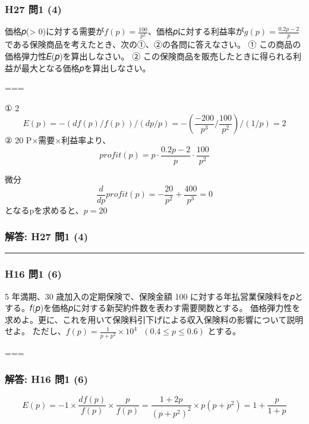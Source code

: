 \documentclass[]{article}
\begin{document}
\hypertarget{h27-ux554f1-4}{%
\subsubsection{H27 問1 (4)}\label{h27-ux554f1-4}}

価格𝑝(\textgreater{}
0)に対する需要が\(f(p)=\frac{100}{p^2}\)、価格𝑝に対する利益率が\(g(p)=\frac{0.2p-2}{p}\)である保険商品を考えたとき、次の①、②の各問に答えなさい。
① この商品の価格弾力性𝐸(𝑝)を算出しなさい。 ②
この保険商品を販売したときに得られる利益が最大となる価格𝑝を算出しなさい。

===

① 2
\[ E(p) = -(df(p)/f(p)) / (dp/p) = -(\frac{-200}{p^3}/\frac{100}{p^2})/(1/p) = 2\]
② 20 P×需要×利益率より、
\[profit(p)=p\cdot\frac{0.2p-2}{p}\cdot\frac{100}{p^2}\]

微分 \[\frac{d}{dp} profit(p) = -\frac{20}{p^2}+\frac{400}{p^3}=0\]
となるpを求めると、\(p=20\)

\hypertarget{ux89e3ux7b54-h27-ux554f1-4}{%
\subsubsection{解答: H27 問1 (4)}\label{ux89e3ux7b54-h27-ux554f1-4}}

\begin{center}\rule{0.5\linewidth}{0.5pt}\end{center}

\hypertarget{h16-ux554f1-6}{%
\subsubsection{H16 問1 (6)}\label{h16-ux554f1-6}}

5 年満期、30 歳加入の定期保険で、保険金額 100
に対する年払営業保険料を𝑝とする。𝑓(𝑝)を価格𝑝に対する新契約件数を表わす需要関数とする。
価格弾力性を求めよ。更に、これを用いて保険料引下げによる収入保険料の影響について説明せよ。
ただし、\(f(p)=\frac{1}{p+p^2}\times 10^4\ \ \  (0.4\leq p \leq 0.6)\)
とする。

===

\hypertarget{ux89e3ux7b54-h16-ux554f1-6}{%
\subsubsection{解答: H16 問1 (6)}\label{ux89e3ux7b54-h16-ux554f1-6}}

\[E(p)=-1\times\frac{df(p)}{f(p)}\times\frac{p}{f(p)}
=\frac{1+2p}{(p+p^2)^2}\times p(p+p^2)
= 1 + \frac{p}{1+p}\]
\end{document}
